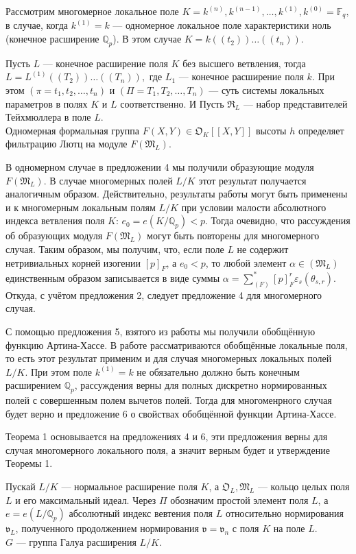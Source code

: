 \documentclass[a4paper]{article}
\newcommand{\Qp}{\mathbb{Q}_p}
\newcommand{\Fq}{\mathbb{F}_q}
\newcommand{\ML}{\mathfrak{M}_L}
\newcommand{\OK}{\mathfrak{O}_K}
\newcommand{\OL}{\mathfrak{O}_L}
\newcommand{\RL}{\mathfrak{R}_L}
\newcommand{\val}{\mathfrak{v}}
\begin{document}
\pagebreak

Рассмотрим многомерное локальное поле $K=k^{(n)}, k^{(n-1)},\dots,k^{(1)},k^{(0)}=\Fq,$ в случае, когда $k^{(1)} = k$ --- одномерное локальное поле характеристики ноль (конечное расширение $\Qp$). В этом случае $K = k((t_2))\dots((t_n)).$ 

Пусть $L$ --- конечное расширение поля $K$ без высшего ветвления, тогда $L = L^{(1)}((T_2))\dots((T_n)),$ где $L_1$ --- конечное расширение поля $k$. При этом $(\pi = t_1, t_2, \dots, t_n)$ и $(\Pi = T_1, T_2, \dots, T_n)$ --- суть системы локальных параметров в полях $K$ и $L$ соответственно. И Пусть $\RL$ --- набор представителей Тейхмюллера в поле $L$.\\

Одномерная формальная группа $F(X,Y)\in\OK[[X,Y]]$ высоты $h$ определяет фильтрацию Лютц на модуле $F(\ML)$.

В одномерном случае в предложении 4 мы получили образующие модуля $F(\ML)$. В случае многомерных полей $L/K$ этот результат получается аналогичным образом. Действительно, результаты работы \cite{book2} могут быть применены и к многомерным локальным полям $L/K$ при условии малости абсолютного индекса ветвления поля $K$: $e_0=e(K/\Qp)<p$. Тогда очевидно, что рассуждения об образующих модуля $F(\ML)$ могут быть повторены для многомерного случая. Таким образом, мы получим, что, если поле $L$ не содержит нетривиальных корней изогении $[p]_F$, а $e_0 < p$, то любой элемент $\alpha\in(\ML)$ единственным образом записывается в виде суммы $\alpha={\sum}_{(F)}^*[p]_F^r\varepsilon_s(\theta_{s,r})$. Откуда, с учётом предложения 2, следует предложение 4 для многомерного случая.

С помощью предложения 5, взятого из работы \cite{GroupsClassification} мы получили обобщённую функцию Артина-Хассе. В работе \cite{GroupsClassification} рассматриваются обобщённые локальные поля, то есть этот результат применим и для случая многомерных локальных полей $L/K$. При этом поле $k^{(1)}=k$ не обязательно должно быть конечным расширением $\Qp$, рассуждения верны для полных дискретно нормированных полей с совершенным полем вычетов полей. Тогда для многоменрного случая будет верно и предложение 6 о свойствах обобщённой функции Артина-Хассе.

Теорема 1 основывается на предложениях 4 и 6, эти предложения верны для случая многомерного локального поля, а значит верным будет и утверждение Теоремы 1.


\pagebreak

Пускай $L/K$ --- нормальное расширение поля $K$, а $\OL,\ML$ --- кольцо целых поля $L$ и его максимальный идеал. Через $\Pi$ обозначим простой элемент поля $L$, а $e=e(L/\Qp)$ абсолютный индекс вевтения поля $L$ относительно нормирования $\val_L$, полученного продолжением нормирования $\val=\val_n$ с поля $K$ на поле $L$.\\
$G$ --- группа Галуа расширения $L/K$.
\end{document}

